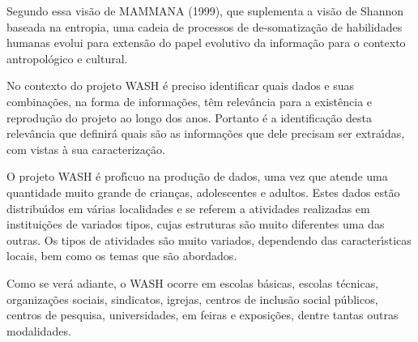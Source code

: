 \documentclass[
12pt,		%
openright,	%
twoside,  %
a4paper,			%
chapter=TITLE,		%
english,			%
french,				%
spanish,			%
brazil				%
]{USPSC-classe/USPSC_RedarTex}
\begin{document}
\noindent\begin{center}\mbox{\centering{}}\end{center}


Segundo essa vis\~ao de  MAMMANA (1999), que suplementa a vis\~ao de Shannon baseada na entropia, uma cadeia de processos de de-somatiza\c{c}\~ao de habilidades humanas evolui para extens\~ao do papel evolutivo da informa\c{c}\~ao para o contexto antropol\'ogico e cultural.










No contexto do projeto WASH \'e preciso identificar quais dados e suas combina\c{c}\~oes, na forma de informa\c{c}\~oes, t\^em relev\^ancia para a exist\^encia e reprodu\c{c}\~ao do projeto ao longo dos anos. Portanto \'e a identifica\c{c}\~ao desta relev\^ancia que definir\'a quais s\~ao as informa\c{c}\~oes que dele precisam ser extra\'{\i}das, com vistas \`a sua caracteriza\c{c}\~ao.










O projeto WASH \'e prof\'{\i}cuo na produ\c{c}\~ao de dados, uma vez que atende uma quantidade muito grande de crian\c{c}as, adolescentes e adultos. Estes dados est\~ao distribu\'{\i}dos em v\'arias localidades e se referem a atividades realizadas em institui\c{c}\~oes de variados tipos, cujas estruturas s\~ao muito diferentes uma das outras. Os tipos de atividades s\~ao muito variados, dependendo das caracter\'{\i}sticas locais, bem como os temas que s\~ao abordados.










Como se ver\'a adiante, o WASH ocorre  em escolas b\'asicas, escolas t\'ecnicas, organiza\c{c}\~oes sociais, sindicatos, igrejas, centros de inclus\~ao social p\'ublicos, centros de pesquisa, universidades, em feiras e exposi\c{c}\~oes, dentre tantas outras modalidades.
\end{document}
